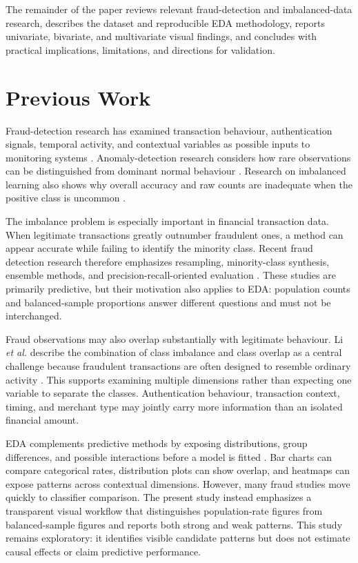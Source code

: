 \documentclass[conference,final,]{IEEEtran}
\begin{document}
The remainder of the paper reviews relevant fraud-detection and
imbalanced-data research, describes the dataset and reproducible EDA
methodology, reports univariate, bivariate, and multivariate visual
findings, and concludes with practical implications, limitations, and
directions for validation.

\section{Previous Work}\label{previous-work}

Fraud-detection research has examined transaction behaviour,
authentication signals, temporal activity, and contextual variables as
possible inputs to monitoring systems \citep{abdallah2016}.
Anomaly-detection research considers how rare observations can be
distinguished from dominant normal behaviour \citep{chandola2009}.
Research on imbalanced learning also shows why overall accuracy and raw
counts are inadequate when the positive class is uncommon
\citep{he2009}.

The imbalance problem is especially important in financial transaction
data. When legitimate transactions greatly outnumber fraudulent ones, a
method can appear accurate while failing to identify the minority class.
Recent fraud detection research therefore emphasizes resampling,
minority-class synthesis, ensemble methods, and
precision-recall-oriented evaluation
\citep{fiore2019, kennedy2024, bekereci2024}. These studies are
primarily predictive, but their motivation also applies to EDA:
population counts and balanced-sample proportions answer different
questions and must not be interchanged.

Fraud observations may also overlap substantially with legitimate
behaviour. Li \emph{et al.} describe the combination of class imbalance
and class overlap as a central challenge because fraudulent transactions
are often designed to resemble ordinary activity \citep{li2021}. This
supports examining multiple dimensions rather than expecting one
variable to separate the classes. Authentication behaviour, transaction
context, timing, and merchant type may jointly carry more information
than an isolated financial amount.

EDA complements predictive methods by exposing distributions, group
differences, and possible interactions before a model is fitted
\citep{tukey1977}. Bar charts can compare categorical rates,
distribution plots can show overlap, and heatmaps can expose patterns
across contextual dimensions. However, many fraud studies move quickly
to classifier comparison. The present study instead emphasizes a
transparent visual workflow that distinguishes population-rate figures
from balanced-sample figures and reports both strong and weak patterns.
This study remains exploratory: it identifies visible candidate patterns
but does not estimate causal effects or claim predictive performance.
\end{document}
